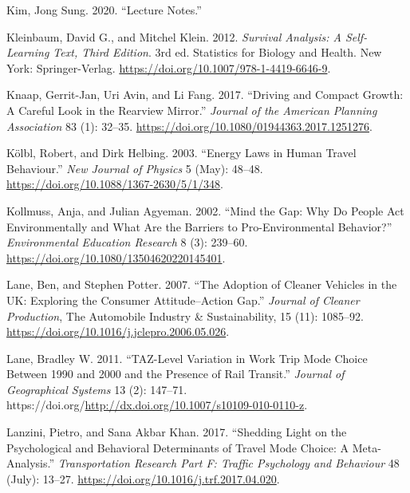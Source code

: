 \documentclass[
  11pt,
  openany]{memoir}
\newlength{\cslhangindent}
\newlength{\cslentryspacingunit} %
\newenvironment{CSLReferences}[2] %
 {%
  \setlength{\parindent}{0pt}
  \ifodd #1
  \let\oldpar\par
  \def\par{\hangindent=\cslhangindent\oldpar}
  \fi
  \setlength{\parskip}{#2\cslentryspacingunit}
 }%
 {}
\begin{document}
\begin{CSLReferences}{1}{0}
\leavevmode{}%
Kim, Jong Sung. 2020. {``Lecture {Notes}.''}

\leavevmode{}%
Kleinbaum, David G., and Mitchel Klein. 2012. \emph{Survival {Analysis}: A {Self}-{Learning Text}, {Third Edition}}. 3rd ed. Statistics for {Biology} and {Health}. {New York}: {Springer-Verlag}. \url{https://doi.org/10.1007/978-1-4419-6646-9}.

\leavevmode{}%
Knaap, Gerrit-Jan, Uri Avin, and Li Fang. 2017. {``Driving and {Compact Growth}: A {Careful Look} in the {Rearview Mirror}.''} \emph{Journal of the American Planning Association} 83 (1): 32--35. \url{https://doi.org/10.1080/01944363.2017.1251276}.

\leavevmode{}%
Kölbl, Robert, and Dirk Helbing. 2003. {``Energy Laws in Human Travel Behaviour.''} \emph{New Journal of Physics} 5 (May): 48--48. \url{https://doi.org/10.1088/1367-2630/5/1/348}.

\leavevmode{}%
Kollmuss, Anja, and Julian Agyeman. 2002. {``Mind the {Gap}: Why Do People Act Environmentally and What Are the Barriers to Pro-Environmental Behavior?''} \emph{Environmental Education Research} 8 (3): 239--60. \url{https://doi.org/10.1080/13504620220145401}.

\leavevmode{}%
Lane, Ben, and Stephen Potter. 2007. {``The Adoption of Cleaner Vehicles in the {UK}: Exploring the Consumer Attitude--Action Gap.''} \emph{Journal of Cleaner Production}, The {Automobile Industry} \& {Sustainability}, 15 (11): 1085--92. \url{https://doi.org/10.1016/j.jclepro.2006.05.026}.

\leavevmode{}%
Lane, Bradley W. 2011. {``{TAZ}-Level Variation in Work Trip Mode Choice Between 1990 and 2000 and the Presence of Rail Transit.''} \emph{Journal of Geographical Systems} 13 (2): 147--71. https://doi.org/\url{http://dx.doi.org/10.1007/s10109-010-0110-z}.

\leavevmode{}%
Lanzini, Pietro, and Sana Akbar Khan. 2017. {``Shedding Light on the Psychological and Behavioral Determinants of Travel Mode Choice: A Meta-Analysis.''} \emph{Transportation Research Part F: Traffic Psychology and Behaviour} 48 (July): 13--27. \url{https://doi.org/10.1016/j.trf.2017.04.020}.


\end{CSLReferences}
\end{document}
